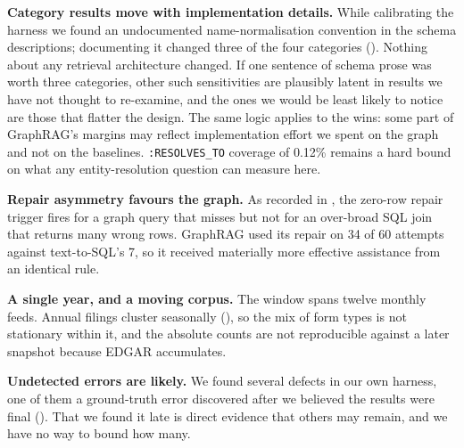 \textbf{Category results move with implementation details.} While calibrating
the harness we found an undocumented name-normalisation convention in the schema
descriptions; documenting it changed three of the four categories
(). Nothing about any retrieval architecture changed. If one
sentence of schema prose was worth three categories, other such sensitivities are
plausibly latent in results we have not thought to re-examine, and the ones we
would be least likely to notice are those that flatter the design. The same logic
applies to the wins: some part of GraphRAG's margins may reflect implementation
effort we spent on the graph and not on the baselines.
\texttt{:RESOLVES\_TO} coverage of 0.12\% remains a hard bound on what any
entity-resolution question can measure here.

\textbf{Repair asymmetry favours the graph.} As recorded in ,
the zero-row repair trigger fires for a graph query that misses but not for an
over-broad SQL join that returns many wrong rows. GraphRAG used its repair on 34
of 60 attempts against text-to-SQL's 7, so it received materially more effective
assistance from an identical rule.

\textbf{A single year, and a moving corpus.} The window spans twelve monthly
feeds. Annual filings cluster seasonally (), so the mix of form
types is not stationary within it, and the absolute counts are not reproducible
against a later snapshot because EDGAR accumulates.

\textbf{Undetected errors are likely.} We found several defects in our own
harness, one of them a ground-truth error discovered after we believed the
results were final (). That we found it late is direct evidence
that others may remain, and we have no way to bound how many.
